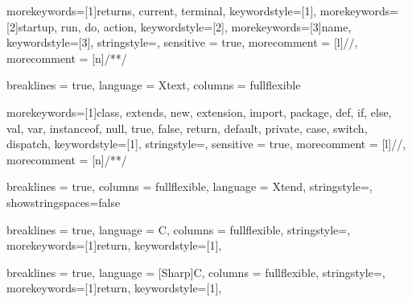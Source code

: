 \newcommand{\javainline}[1]{\lstinline[style = java, basicstyle = \ttfamily\normalsize]{#1}}

{
    morekeywords=[1]{returns, current, terminal}, 
    keywordstyle=[1]\color{DarkOrchid},
    morekeywords=[2]{startup, run, do, action},
    keywordstyle=[2]\color{eclipse_blue},
    morekeywords=[3]{name},
    keywordstyle=[3]\color{red},
    stringstyle=\color{Goldenrod},
    sensitive = true,
    morecomment = [l]{//},
    morecomment = [n]{/*}{*/}
}

{
  breaklines = true,
  language = Xtext,
  columns = fullflexible
}

\newcommand{\xtextinline}[1]{\lstinline[style = xtext, basicstyle = \ttfamily\normalsize]{#1}}

{
    morekeywords=[1]{class, extends, new, extension, import, package, def, if, else, val, var, instanceof, null, true, false, return, default, private, case, switch, dispatch}, 
    keywordstyle=[1]\color{DarkOrchid},
    stringstyle=\color{eclipse_blue},
    sensitive = true,
    morecomment = [l]{//},
    morecomment = [n]{/*}{*/}
}

{
    breaklines = true,
    columns = fullflexible,
    language = Xtend,
    stringstyle=\color{eclipse_blue},
    showstringspaces=false
}

\newcommand{\xtendinline}[1]{\lstinline[style = xtend, basicstyle = \ttfamily\normalsize]{#1}}


{
    breaklines = true,
    language = C,
    columns = fullflexible,
    stringstyle=\color{eclipse_blue},
    morekeywords=[1]{return}, 
    keywordstyle=[1]\color{eclipse_red},
}

\newcommand{\cinline}[1]{\lstinline[style = c, basicstyle = \ttfamily\normalsize]{#1}}


{
    breaklines = true,
    language = [Sharp]C,
    columns = fullflexible,
    stringstyle=\color{eclipse_blue},
    morekeywords=[1]{return}, 
    keywordstyle=[1]\color{eclipse_red},
}

\newcommand{\csinline}[1]{\lstinline[style = cs, basicstyle = \ttfamily\normalsize]{#1}}

